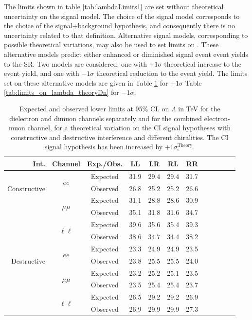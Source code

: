 The limits shown in table \ref{tab:lambdaLimits1} are set without theoretical uncertainty on the signal model.
The choice of the signal model corresponds to the choice of the signal+background hypothesis, and consequently there is no uncertainty related to that definition.
Alternative signal models, corresponding to possible theoretical variations, may also be used to set limits on \lam.
These alternative models predict either enhanced or diminished signal event event yields to the SR.
Two models are considered: one with $+1\sigma$ theoretical increase to the event yield, and one with $-1\sigma$ theoretical reduction to the event yield.
The limits set on these alternative models are given in Table \ref{tab:limits_on_lambda_theoryUp} for $+1\sigma$ Table \ref{tab:limits_on_lambda_theoryDn} for $-1\sigma$.

\begin{table}[htp]
\begin{center}
\caption{Expected and observed lower limits at 95$\%$ CL on $\Lambda$ in TeV for the dielectron and dimuon channels separately
and for the combined electron-muon channel, for a theoretical variation on the CI signal hypotheses with constructive
and destructive interference and different chiralities.
The CI signal hypothesis has been increased by $+1\sigma_\text{s}^\text{Theory}$.}
{\begin{tabular}{r c c c c c c c c c c c}\toprule
Int. & Channel & Exp./Obs. & LL & LR & RL & RR \\
\midrule
\multirow{3}{*}[-1.5em]{\begin{sideways}Constructive\end{sideways}} & \multirow{2}{*}{$ee$} & Expected & 31.9 & 29.4 & 29.4 & 31.7 \\
& & Observed & 26.8 & 25.2 & 25.2 & 26.6 \\
\cmidrule{2-7}
 & \multirow{2}{*}{$\mu\mu$} & Expected & 31.1 & 28.8 & 28.6 & 30.9 \\
& & Observed & 35.1 & 31.8 & 31.6 & 34.7 \\
\cmidrule{2-7}
 & \multirow{2}{*}{$\ell\ell$} & Expected & 39.6 & 35.6 & 35.4 & 39.3 \\
& & Observed & 38.6 & 34.7 & 34.4 & 38.2 \\
\midrule
\multirow{3}{*}[-1.5em]{\begin{sideways}Destructive\end{sideways}} & \multirow{2}{*}{$ee$} & Expected & 23.3 & 24.9 & 24.9 & 23.5 \\
& & Observed & 23.8 & 25.5 & 25.5 & 24.0 \\
\cmidrule{2-7}
 & \multirow{2}{*}{$\mu\mu$} & Expected & 23.2 & 25.2 & 25.1 & 23.5 \\
& & Observed & 23.5 & 25.4 & 25.4 & 23.7 \\
\cmidrule{2-7}
 & \multirow{2}{*}{$\ell\ell$} & Expected & 26.5 & 29.2 & 29.2 & 26.9 \\
& & Observed & 26.9 & 29.9 & 29.9 & 27.3 \\
\bottomrule\end{tabular}}\\
\label{tab:limits_on_lambda_theoryUp}
\end{center}
\end{table}

